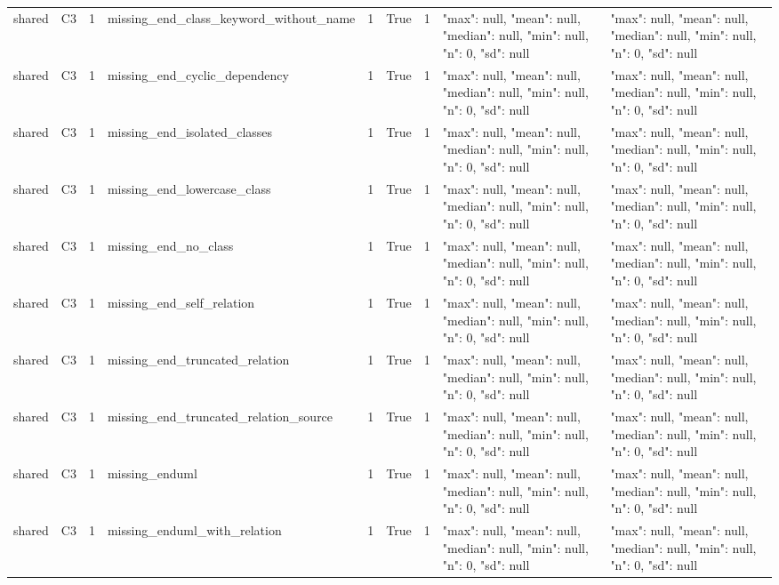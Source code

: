 \begin{tabular}{lllllllll}
shared & C3 & 1 & missing\_end\_class\_keyword\_without\_name & 1 & True & 1 & {"max": null, "mean": null, "median": null, "min": null, "n": 0, "sd": null} & {"max": null, "mean": null, "median": null, "min": null, "n": 0, "sd": null} \\
shared & C3 & 1 & missing\_end\_cyclic\_dependency & 1 & True & 1 & {"max": null, "mean": null, "median": null, "min": null, "n": 0, "sd": null} & {"max": null, "mean": null, "median": null, "min": null, "n": 0, "sd": null} \\
shared & C3 & 1 & missing\_end\_isolated\_classes & 1 & True & 1 & {"max": null, "mean": null, "median": null, "min": null, "n": 0, "sd": null} & {"max": null, "mean": null, "median": null, "min": null, "n": 0, "sd": null} \\
shared & C3 & 1 & missing\_end\_lowercase\_class & 1 & True & 1 & {"max": null, "mean": null, "median": null, "min": null, "n": 0, "sd": null} & {"max": null, "mean": null, "median": null, "min": null, "n": 0, "sd": null} \\
shared & C3 & 1 & missing\_end\_no\_class & 1 & True & 1 & {"max": null, "mean": null, "median": null, "min": null, "n": 0, "sd": null} & {"max": null, "mean": null, "median": null, "min": null, "n": 0, "sd": null} \\
shared & C3 & 1 & missing\_end\_self\_relation & 1 & True & 1 & {"max": null, "mean": null, "median": null, "min": null, "n": 0, "sd": null} & {"max": null, "mean": null, "median": null, "min": null, "n": 0, "sd": null} \\
shared & C3 & 1 & missing\_end\_truncated\_relation & 1 & True & 1 & {"max": null, "mean": null, "median": null, "min": null, "n": 0, "sd": null} & {"max": null, "mean": null, "median": null, "min": null, "n": 0, "sd": null} \\
shared & C3 & 1 & missing\_end\_truncated\_relation\_source & 1 & True & 1 & {"max": null, "mean": null, "median": null, "min": null, "n": 0, "sd": null} & {"max": null, "mean": null, "median": null, "min": null, "n": 0, "sd": null} \\
shared & C3 & 1 & missing\_enduml & 1 & True & 1 & {"max": null, "mean": null, "median": null, "min": null, "n": 0, "sd": null} & {"max": null, "mean": null, "median": null, "min": null, "n": 0, "sd": null} \\
shared & C3 & 1 & missing\_enduml\_with\_relation & 1 & True & 1 & {"max": null, "mean": null, "median": null, "min": null, "n": 0, "sd": null} & {"max": null, "mean": null, "median": null, "min": null, "n": 0, "sd": null} \\

\end{tabular}

